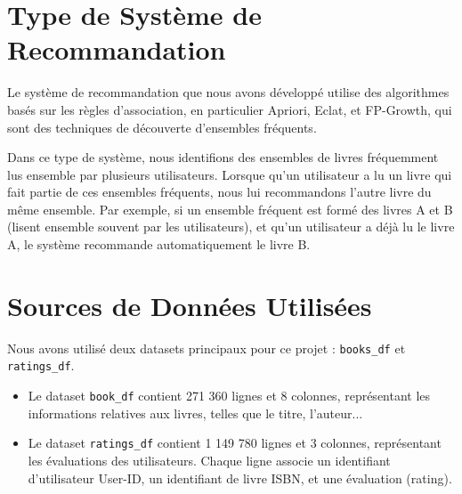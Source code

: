 \documentclass[a4paper, 12pt]{article}
\begin{document}
\newpage
\pagestyle{fancy}
\begin{minipage}{\textwidth}

\section{Type de Système de Recommandation}

\vspace{0.5cm}
\justifying

\hspace{1cm}Le système de recommandation que nous avons développé utilise des algorithmes basés sur les règles d'association, en particulier Apriori, Eclat, et FP-Growth, qui sont des techniques de découverte d'ensembles fréquents.\vspace{0.5cm}

Dans ce type de système, nous identifions des ensembles de livres fréquemment lus ensemble par plusieurs utilisateurs. Lorsque qu'un utilisateur a lu un livre qui fait partie de ces ensembles fréquents, nous lui recommandons l'autre livre du même ensemble. Par exemple, si un ensemble fréquent est formé des livres A et B (lisent ensemble souvent par les utilisateurs), et qu'un utilisateur a déjà lu le livre A, le système recommande automatiquement le livre B.
\end{minipage}


\vspace{1cm}


\section{Sources de Données Utilisées}

\justifying 

Nous avons utilisé deux datasets principaux pour ce projet : \texttt{books\_df} et \texttt{ratings\_df}. 
\begin{itemize}[label=\textbullet]
\item Le dataset \texttt{book\_df} contient 271 360 lignes et 8 colonnes, représentant les informations relatives aux livres, telles que le titre, l'auteur...
\item Le dataset \texttt{ratings\_df} contient 1 149 780 lignes et 3 colonnes, représentant les évaluations des utilisateurs. Chaque ligne associe un identifiant d'utilisateur User-ID, un identifiant de livre ISBN, et une évaluation (rating).
\end{itemize}
\end{document}
